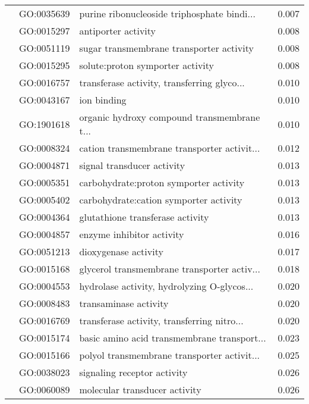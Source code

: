 \begin{longtable}{lllr}
   & GO:0035639 &  purine ribonucleoside triphosphate bindi... &         0.007 \\
   & GO:0015297 &                          antiporter activity &         0.008 \\
   & GO:0051119 &     sugar transmembrane transporter activity &         0.008 \\
   & GO:0015295 &             solute:proton symporter activity &         0.008 \\
   & GO:0016757 &  transferase activity, transferring glyco... &         0.010 \\
   & GO:0043167 &                                  ion binding &         0.010 \\
   & GO:1901618 &  organic hydroxy compound transmembrane t... &         0.010 \\
   & GO:0008324 &  cation transmembrane transporter activit... &         0.012 \\
   & GO:0004871 &                   signal transducer activity &         0.013 \\
   & GO:0005351 &       carbohydrate:proton symporter activity &         0.013 \\
   & GO:0005402 &       carbohydrate:cation symporter activity &         0.013 \\
   & GO:0004364 &             glutathione transferase activity &         0.013 \\
   & GO:0004857 &                    enzyme inhibitor activity &         0.016 \\
   & GO:0051213 &                         dioxygenase activity &         0.017 \\
   & GO:0015168 &  glycerol transmembrane transporter activ... &         0.018 \\
   & GO:0004553 &  hydrolase activity, hydrolyzing O-glycos... &         0.020 \\
   & GO:0008483 &                        transaminase activity &         0.020 \\
   & GO:0016769 &  transferase activity, transferring nitro... &         0.020 \\
   & GO:0015174 &  basic amino acid transmembrane transport... &         0.023 \\
   & GO:0015166 &  polyol transmembrane transporter activit... &         0.025 \\
   & GO:0038023 &                  signaling receptor activity &         0.026 \\
   & GO:0060089 &                molecular transducer activity &         0.026 \\

\end{longtable}
